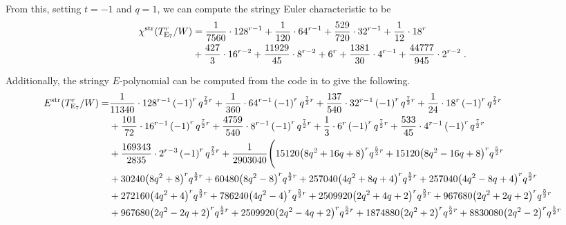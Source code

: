 \documentclass[11pt,english]{amsart}
\numberwithin{equation}{section}
\numberwithin{figure}{section}
\theoremstyle{plain}
\theoremstyle{plain}
\theoremstyle{definition}
\theoremstyle{remark}
\newcommand{\E}{\operatorname{E}}
\newcommand{\str}{\textup{str}}
\begin{document}
From this, setting $t = -1$ and $q = 1$, we can compute the stringy Euler characteristic to be
\begin{align*}
\chi^{\str}(T_{\E_7}^r/W) &= \frac{1}{7560} \cdot 128^{r - 1} + \frac{1}{120} \cdot 64^{r - 1} + \frac{529}{720} \cdot 32^{r - 1} + \frac{1}{12} \cdot 18^{r} \\
& + \frac{427}{3} \cdot 16^{r - 2} + \frac{11929}{45} \cdot 8^{r - 2} + 6^{r} + \frac{1381}{30} \cdot 4^{r - 1} + \frac{44777}{945} \cdot 2^{r - 2}\; .
\end{align*}

Additionally, the stringy $E$-polynomial can be computed from the code in \cite{code_repository} to give the following.
{\tiny
\begin{align*}
E^{\str}(T_{\E_7}^r/W) = & \frac{1}{11340} \cdot 128^{r - 1} \left(-1\right)^{ r} q^{\frac{7}{2} r} + \frac{1}{360} \cdot 64^{r - 1} \left(-1\right)^{ r} q^{\frac{7}{2} r} + \frac{137}{540} \cdot 32^{r - 1} \left(-1\right)^{ r} q^{\frac{7}{2} r} + \frac{1}{24} \cdot 18^{r} \left(-1\right)^{ r} q^{\frac{7}{2} r} \\
& + \frac{101}{72} \cdot 16^{r - 1} \left(-1\right)^{ r} q^{\frac{7}{2} r} + \frac{4759}{540} \cdot 8^{r - 1} \left(-1\right)^{ r} q^{\frac{7}{2} r} + \frac{1}{3} \cdot 6^{r} \left(-1\right)^{ r} q^{\frac{7}{2} r} + \frac{533}{45} \cdot 4^{r - 1} \left(-1\right)^{ r} q^{\frac{7}{2} r} \\
& + \frac{169343}{2835} \cdot 2^{r - 3} \left(-1\right)^{ r} q^{\frac{7}{2} r} + \frac{1}{2903040} \Biggl(15120 {\left(8 q^{2} + 16 q + 8\right)}^{r} q^{\frac{5}{2} r} + 15120 {\left(8 q^{2} - 16 q + 8\right)}^{r} q^{\frac{5}{2} r} \\
& + 30240 {\left(8 q^{2} + 8\right)}^{r} q^{\frac{5}{2} r} + 60480 {\left(8 q^{2} - 8\right)}^{r} q^{\frac{5}{2} r} + 257040 {\left(4 q^{2} + 8 q + 4\right)}^{r} q^{\frac{5}{2} r} + 257040 {\left(4 q^{2} - 8 q + 4\right)}^{r} q^{\frac{5}{2} r} \\
& + 272160 {\left(4 q^{2} + 4\right)}^{r} q^{\frac{5}{2} r} + 786240 {\left(4 q^{2} - 4\right)}^{r} q^{\frac{5}{2} r} + 2509920 {\left(2 q^{2} + 4 q + 2\right)}^{r} q^{\frac{5}{2} r} + 967680 {\left(2 q^{2} + 2 q + 2\right)}^{r} q^{\frac{5}{2} r} \\
& + 967680 {\left(2 q^{2} - 2 q + 2\right)}^{r} q^{\frac{5}{2} r} + 2509920 {\left(2 q^{2} - 4 q + 2\right)}^{r} q^{\frac{5}{2} r} + 1874880 {\left(2 q^{2} + 2\right)}^{r} q^{\frac{5}{2} r} + 8830080 {\left(2 q^{2} - 2\right)}^{r} q^{\frac{5}{2} r} \\

\end{align*}}
\end{document}
